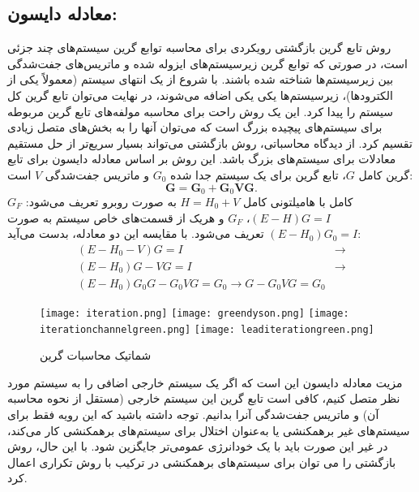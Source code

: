\subsection{معادله دایسون:}
روش تابع گرین بازگشتی رویکردی برای محاسبه توابع گرین سیستم‌های چند جزئی است، در صورتی که توابع گرین زیرسیستم‌های ایزوله شده و ماتریس‌های جفت‌شدگی بین زیرسیستم‌ها شناخته شده باشند. با شروع از یک انتهای سیستم (معمولاً یکی از الکترودها)، زیرسیستم‌ها یکی یکی اضافه می‌شوند، در نهایت می‌توان تابع گرین کل سیستم را پیدا کرد. این یک روش راحت برای محاسبه مولفه‌های تابع گرین مربوطه برای سیستم‌های پیچیده بزرگ است که می‌توان آنها را به بخش‌های متصل زیادی تقسیم کرد. از دیدگاه محاسباتی، روش بازگشتی می‌تواند بسیار سریع‌تر از حل مستقیم معادلات برای سیستم‌های بزرگ باشد.
این روش بر اساس معادله دایسون برای تابع گرین کامل $G$، تابع گرین برای یک سیستم جدا شده $G_0$ و ماتریس جفت‌شدگی $V$ است:
\begin{equation}
    \mathbf{G}={{\mathbf{G}}_{0}}+{{\mathbf{G}}_{0}}\mathbf{VG}.
    \label{eq:dyson}
\end{equation}
$G_F$ کامل با هامیلتونی کامل $H = H_0 + V$ به صورت روبرو تعریف می‌شود: $(E - H) G = I$، $G_F$ و هریک از قسمت‌های خاص سیستم به صورت $(E - H_0) G_0 = I$ تعریف می‌شود. با مقایسه این دو معادله، بدست می‌آید:
	\begin{equation}
	\begin{split}
	\left(E-H_0-V\right) G=I &\rightarrow\\
    \left(E-H_0\right)G-VG=I&\rightarrow\\
    \left(E-H_0\right)G_0G-G_0VG=G_0\rightarrow G-G_0VG=G_0
\end{split}
\end{equation}

\begin{figure*}
    \centering
    \texttt{[image: iteration.png]}
    \texttt{[image: greendyson.png]}
    \texttt{[image: iterationchannelgreen.png]}
    \texttt{[image: leaditerationgreen.png]}
    \caption{شماتیک محاسبات گرین}
    \label{fig:greendyson}
\end{figure*}
مزیت معادله دایسون این است که اگر یک سیستم خارجی اضافی را به سیستم مورد نظر متصل کنیم، کافی است تابع گرین این سیستم خارجی (مستقل از نحوه محاسبه آن) و ماتریس جفت‌شدگی آنرا بدانیم. توجه داشته باشید که این رویه فقط برای سیستم‌های غیر برهمکنشی یا به‌عنوان اختلال  برای سیستم‌های برهمکنشی کار می‌کند، در غیر این صورت  باید با یک خود‌انرژی عمومی‌تر جایگزین شود. با این حال، روش بازگشتی را می توان برای سیستم‌های برهمکنشی در ترکیب با روش تکراری اعمال کرد.

